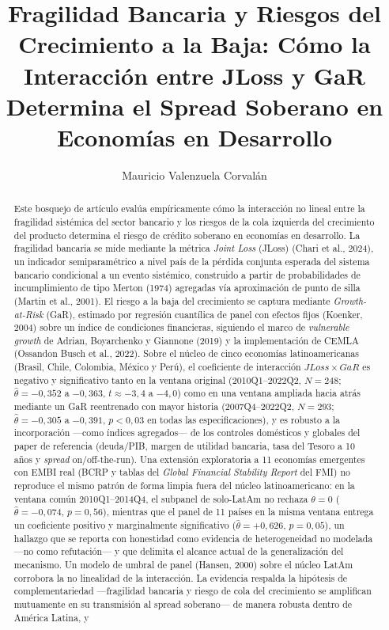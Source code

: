 \documentclass[5p,times,twocolumn,authoryear]{elsarticle}
\begin{document}
\begin{frontmatter}

\title{Fragilidad Bancaria y Riesgos del Crecimiento a la Baja: Cómo la Interacción entre JLoss y GaR Determina el Spread Soberano en Economías en Desarrollo}

\author[1]{Mauricio Valenzuela Corvalán}

\begin{abstract}
Este bosquejo de artículo evalúa empíricamente cómo la interacción no lineal entre la fragilidad sistémica del sector bancario y los riesgos de la cola izquierda del crecimiento del producto determina el riesgo de crédito soberano en economías en desarrollo. La fragilidad bancaria se mide mediante la métrica \textit{Joint Loss} (JLoss) (Chari et al., 2024), un indicador semiparamétrico a nivel país de la pérdida conjunta esperada del sistema bancario condicional a un evento sistémico, construido a partir de probabilidades de incumplimiento de tipo Merton (1974) agregadas vía aproximación de punto de silla (Martin et al., 2001). El riesgo a la baja del crecimiento se captura mediante \textit{Growth-at-Risk} (GaR), estimado por regresión cuantílica de panel con efectos fijos (Koenker, 2004) sobre un índice de condiciones financieras, siguiendo el marco de \textit{vulnerable growth} de Adrian, Boyarchenko y Giannone (2019) y la implementación de CEMLA (Ossandon Busch et al., 2022). Sobre el núcleo de cinco economías latinoamericanas (Brasil, Chile, Colombia, México y Perú), el coeficiente de interacción $JLoss\times GaR$ es negativo y significativo tanto en la ventana original (2010Q1--2022Q2, $N=248$; $\hat\theta=-0{,}352$ a $-0{,}363$, $t\approx-3{,}4$ a $-4{,}0$) como en una ventana ampliada hacia atrás mediante un GaR reentrenado con mayor historia (2007Q4--2022Q2, $N=293$; $\hat\theta=-0{,}305$ a $-0{,}391$, $p<0{,}03$ en todas las especificaciones), y es robusto a la incorporación —como índices agregados— de los controles domésticos y globales del paper de referencia (deuda/PIB, margen de utilidad bancaria, tasa del Tesoro a 10 años y \textit{spread} on/off-the-run). Una extensión exploratoria a 11 economías emergentes con EMBI real (BCRP y tablas del \textit{Global Financial Stability Report} del FMI) no reproduce el mismo patrón de forma limpia fuera del núcleo latinoamericano: en la ventana común 2010Q1--2014Q4, el subpanel de solo-LatAm no rechaza $\theta=0$ ($\hat\theta=-0{,}074$, $p=0{,}56$), mientras que el panel de 11 países en la misma ventana entrega un coeficiente positivo y marginalmente significativo ($\hat\theta=+0{,}626$, $p=0{,}05$), un hallazgo que se reporta con honestidad como evidencia de heterogeneidad no modelada —no como refutación— y que delimita el alcance actual de la generalización del mecanismo. Un modelo de umbral de panel (Hansen, 2000) sobre el núcleo LatAm corrobora la no linealidad de la interacción. La evidencia respalda la hipótesis de complementariedad —fragilidad bancaria y riesgo de cola del crecimiento se amplifican mutuamente en su transmisión al spread soberano— de manera robusta dentro de América Latina, y 
\end{abstract}
\end{frontmatter}
\end{document}
